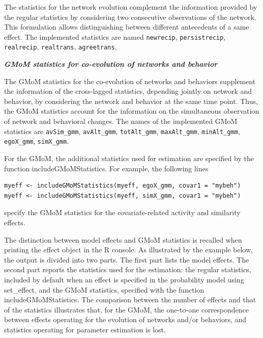\documentclass[a4paper,fleqn,11pt]{article}
\newcommand{\+}{\, + \,}
\newcommand{\sfn}[1]{\textsf{#1}}
\begin{document}
The statistics for the network evolution \citep{ASS2015}
complement the information provided by the regular statistics by
considering two consecutive observations of the network.
This formulation allows distinguishing between different antecedents of a same effect.
The implemented statistics are named \texttt{newrecip}, \texttt{persistrecip}, \texttt{realrecip},
\texttt{realtrans}, \texttt{agreetrans}.
\bigskip

\noindent
\textbf{\emph{GMoM statistics for co-evolution of networks and behavior }}
\medskip

The GMoM statistics for the co-evolution of networks and behaviors \citep{ASS2019}
supplement the information of the cross-lagged statistics, depending jointly
on network and behavior, by considering the network and behavior at the same time point.
Thus, the GMoM statistics account for the information on the simultaneous observation
of network and behavioral changes. The names of the implemented GMoM statistics
are \texttt{avSim\_gmm}, \texttt{avAlt\_gmm}, \texttt{totAlt\_gmm}, \texttt{maxAlt\_gmm},
\texttt{minAlt\_gmm}, \texttt{egoX\_gmm}, \texttt{simX\_gmm}.

For the GMoM, the additional statistics used for estimation are specified by
the function \sfn{includeGMoMStatistics}. For example, the following lines
\begin{verbatim}
myeff <- includeGMoMStatistics(myeff, egoX_gmm, covar1 = "mybeh")
myeff <- includeGMoMStatistics(myeff, simX_gmm, covar1 = "mybeh")
\end{verbatim}
specify the GMoM statistics for the covariate-related activity and similarity effects.

The distinction between model effects
and GMoM statistics is recalled when printing the effect object in the R console.
As illustrated by the example below, the output is divided into two parts.
The first part lists the model effects.
The second part reports the statistics used for the estimation:
the regular statistics, included by default when an effect is specified
in the probability model using \sfn{set\_effect},
and the GMoM statistics, specified with the function \sfn{includeGMoMStatistics}.
The comparison between the number of effects and that of the statistics
illustrates that, for the GMoM, the one-to-one correspondence
between effects operating for the evolution of networks and/or behaviors,
and statistics operating for parameter estimation is lost.
\end{document}
